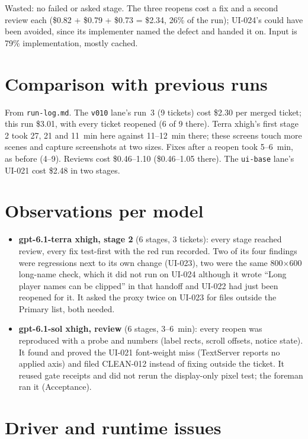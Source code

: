 \documentclass[11pt,a4paper]{article}
\begin{document}
Wasted: no failed or asked stage. The three reopens cost a fix and a second review each
(\$0.82 + \$0.79 + \$0.73 = \$2.34, 26\% of the run); UI-024's could have been avoided, since its
implementer named the defect and handed it on. Input is 79\% implementation, mostly cached.

\section*{Comparison with previous runs}

From \texttt{run-log.md}. The \texttt{v010} lane's run~3 (9 tickets) cost \$2.30 per merged
ticket; this run \$3.01, with every ticket reopened (6 of 9 there). Terra xhigh's first stage 2
took 27, 21 and 11~min here against 11--12~min there; these screens touch more scenes and
capture screenshots at two sizes. Fixes after a reopen took 5--6~min, as before (4--9). Reviews
cost \$0.46--1.10 (\$0.46--1.05 there). The \texttt{ui-base} lane's UI-021 cost \$2.48 in two
stages.

\section*{Observations per model}

\begin{itemize}
  \item \textbf{gpt-6.1-terra xhigh, stage 2} (6 stages, 3 tickets): every stage reached review,
        every fix test-first with the red run recorded. Two of its four findings were regressions
        next to its own change (UI-023), two were the same 800$\times$600 long-name check, which it
        did not run on UI-024 although it wrote ``Long player names can be clipped'' in that
        handoff and UI-022 had just been reopened for it. It asked the proxy twice on UI-023 for
        files outside the Primary list, both needed.
  \item \textbf{gpt-6.1-sol xhigh, review} (6 stages, 3--6~min): every reopen was reproduced with
        a probe and numbers (label rects, scroll offsets, notice state). It found and proved the
        UI-021 font-weight miss (TextServer reports no applied axis) and filed CLEAN-012 instead of
        fixing outside the ticket. It reused gate receipts and did not rerun the display-only
        pixel test; the foreman ran it (Acceptance).
\end{itemize}

\section*{Driver and runtime issues}
\end{document}
